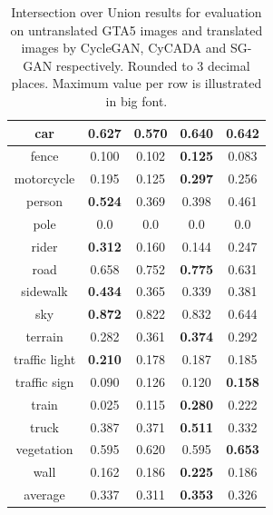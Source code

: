 \begin{table}
\begin{tabular}{|c|c|c|c|c|}
		\hline 
		car & 0.627 & 0.570 & 0.640 & \textbf{0.642}\\ 
		\hline 
		fence & 0.100 & 0.102 & \textbf{0.125} & 0.083\\ 
		\hline 
		motorcycle & 0.195 & 0.125 & \textbf{0.297} & 0.256\\ 
		\hline 
		person & \textbf{0.524} & 0.369 & 0.398 & 0.461\\ 
		\hline 
		pole & 0.0 & 0.0 & 0.0 & 0.0\\ 
		\hline 
		rider & \textbf{0.312} & 0.160 & 0.144 & 0.247\\ 
		\hline 
		road & 0.658 & 0.752 & \textbf{0.775} & 0.631\\ 
		\hline 
		sidewalk & \textbf{0.434} & 0.365 & 0.339 & 0.381\\ 
		\hline 
		sky & \textbf{0.872} & 0.822 & 0.832 & 0.644\\ 
		\hline 
		terrain & 0.282 & 0.361 & \textbf{0.374} & 0.292\\ 
		\hline 
		traffic light & \textbf{0.210} & 0.178 & 0.187 & 0.185\\ 
		\hline 
		traffic sign & 0.090 & 0.126 & 0.120 & \textbf{0.158}\\ 
		\hline 
		train & 0.025 & 0.115 & \textbf{0.280} & 0.222\\ 
		\hline 
		truck & 0.387 & 0.371 & \textbf{0.511} & 0.332\\ 
		\hline 
		vegetation & 0.595 & 0.620 & 0.595 & \textbf{0.653}\\ 
		\hline 
		wall & 0.162 & 0.186 & \textbf{0.225} & 0.186\\ 
		\hline \hline 
		average & 0.337 & 0.311 & \textbf{0.353} & 0.326\\
		\hline
	\end{tabular} 
	\caption{Intersection over Union results for evaluation on untranslated GTA5 images and translated images by CycleGAN, CyCADA and SG-GAN respectively. Rounded to 3 decimal places. Maximum value per row is illustrated in big font.}
	\label{table:results_quant}
\end{table}

